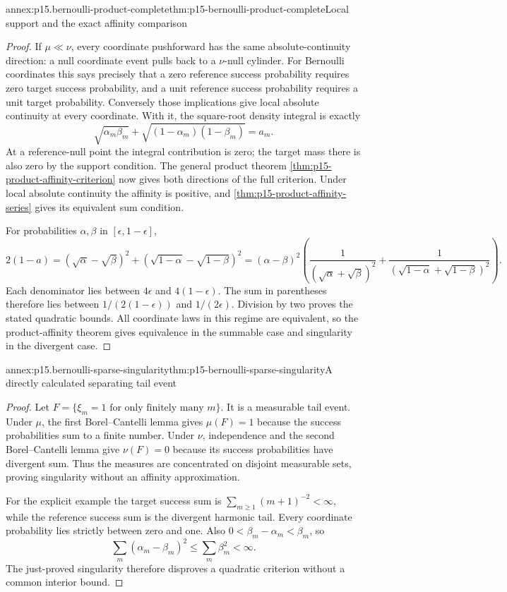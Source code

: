 \begin{annexitem}{annex:p15.bernoulli-product-complete}{thm:p15-bernoulli-product-complete}{Local support and the exact affinity comparison}
\begin{proof}
If \(\mu\ll\nu\), every coordinate pushforward has the same
absolute-continuity direction: a null coordinate event pulls back to
a \(\nu\)-null cylinder.
For Bernoulli coordinates this says precisely that a zero reference
success probability requires zero target success probability, and a
unit reference success probability requires a unit target probability.
Conversely those implications give local absolute continuity at
every coordinate. With it, the square-root density integral is exactly
\[
       \sqrt{\alpha_m\beta_m}
                     +\sqrt{(1-\alpha_m)(1-\beta_m)}=a_m.
\]
At a reference-null point the integral contribution is zero; the
target mass there is also zero by the support condition.
The general product theorem
\cref{thm:p15-product-affinity-criterion} now gives both directions
of the full criterion. Under local absolute continuity the affinity
is positive, and \cref{thm:p15-product-affinity-series} gives its
equivalent sum condition.

For probabilities \(\alpha,\beta\) in \([\epsilon,1-\epsilon]\),
\[
 2(1-a)
   =(\sqrt\alpha-\sqrt\beta)^2
       +(\sqrt{1-\alpha}-\sqrt{1-\beta})^2
   =(\alpha-\beta)^2
       \left(\frac1{(\sqrt\alpha+\sqrt\beta)^2}
        +\frac1{(\sqrt{1-\alpha}+\sqrt{1-\beta})^2}\right).
\]
Each denominator lies between \(4\epsilon\) and \(4(1-\epsilon)\).
The sum in parentheses therefore lies between
\(1/(2(1-\epsilon))\) and \(1/(2\epsilon)\).
Division by two proves the stated quadratic bounds.
All coordinate laws in this regime are equivalent, so the
product-affinity theorem gives equivalence in the summable case
and singularity in the divergent case.
\end{proof}
\end{annexitem}

\begin{annexitem}{annex:p15.bernoulli-sparse-singularity}{thm:p15-bernoulli-sparse-singularity}{A directly calculated separating tail event}
\begin{proof}
Let \(F=\{\xi_m=1\text{ for only finitely many }m\}\).
It is a measurable tail event.
Under \(\mu\), the first Borel--Cantelli lemma gives \(\mu(F)=1\)
because the success probabilities sum to a finite number.
Under \(\nu\), independence and the second Borel--Cantelli lemma
give \(\nu(F)=0\) because its success probabilities have divergent sum.
Thus the measures are concentrated on disjoint measurable sets,
proving singularity without an affinity approximation.

For the explicit example the target success sum is
\(\sum_{m\geq1}(m+1)^{-2}<\infty\), while the reference success sum
is the divergent harmonic tail. Every coordinate probability lies
strictly between zero and one.
Also \(0<\beta_m-\alpha_m<\beta_m\), so
\[
                  \sum_m(\alpha_m-\beta_m)^2
                       \leq\sum_m\beta_m^2<\infty.
\]
The just-proved singularity therefore disproves a quadratic criterion
without a common interior bound.
\end{proof}
\end{annexitem}

